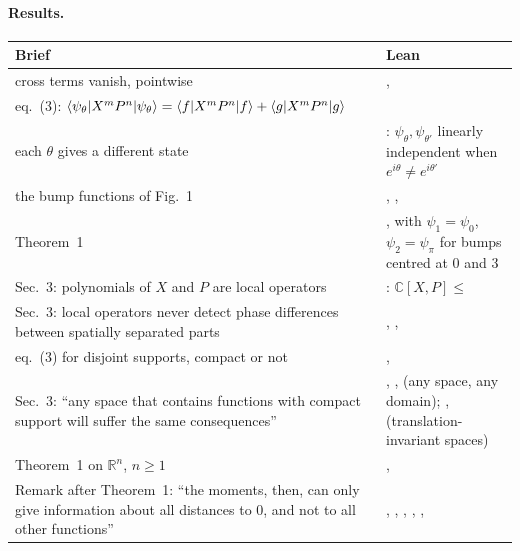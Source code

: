 \documentclass[11pt]{article}
\begin{document}
\paragraph{Results.}
\begin{center}
\begin{tabularx}{\textwidth}{@{}BL@{}}
\toprule
Brief & Lean \\
\midrule
cross terms vanish, pointwise & ,  \\
eq.~(3): $\braket{\psi_\theta|X^mP^n|\psi_\theta} = \braket{f|X^mP^n|f} + \braket{g|X^mP^n|g}$ &  \\
each $\theta$ gives a different state & : $\psi_\theta, \psi_{\theta'}$ linearly independent when $e^{i\theta} \ne e^{i\theta'}$ \\
the bump functions of Fig.~1 & , ,  \\
Theorem~1 & , with $\psi_1 = \psi_0$, $\psi_2 = \psi_\pi$ for bumps centred at $0$ and $3$ \\
Sec.~3: polynomials of $X$ and $P$ are local operators & : $\mathbb{C}[X, P] \le$  \\
Sec.~3: local operators never detect phase differences between spatially separated parts & , ,  \\
eq.~(3) for disjoint supports, compact or not & ,  \\
Sec.~3: ``any space that contains functions with compact support will suffer the same consequences'' & , ,  (any space, any domain); ,  (translation-invariant spaces) \\
Theorem~1 on $\mathbb{R}^n$, $n \ge 1$ & ,  \\
Remark after Theorem~1: ``the moments, then, can only give information about all distances to 0, and not to all other functions'' & , , , , ,  \\
\bottomrule
\end{tabularx}
\end{center}
\end{document}
